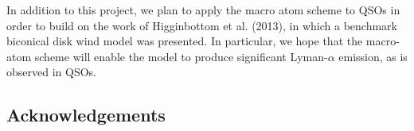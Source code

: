 \documentclass[useAMS,usenatbib, onecolumn]{mn2ejm}
\begin{document}
In addition to this project, we plan to apply the macro atom scheme to QSOs in order to build on the work of Higginbottom et al. (2013),
in which a benchmark biconical disk wind model was presented. In particular, we hope that the macro-atom scheme will enable the
model to produce significant Lyman-$\alpha$ emission, as is observed in QSOs.


\subsection*{Acknowledgements}




\end{document}
